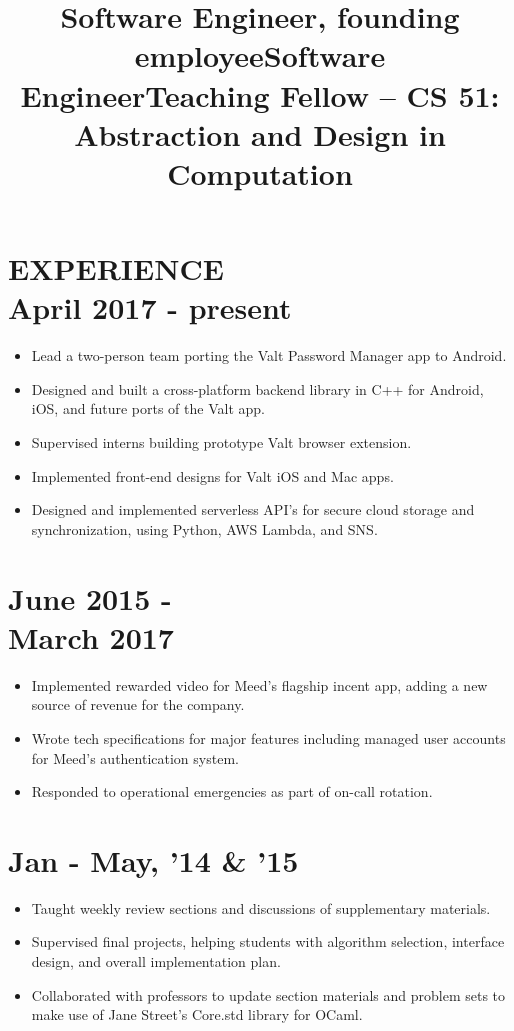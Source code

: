 \documentclass[centered, margin, 10pt]{res} %
\newcommand\mainsectionfont{\normalsize\bf\textup}
\newcommand\subsectionfont{\small\textmd\textup}
\renewcommand\sectionfont{\mainsectionfont} %
\renewcommand\dates{\section} %
\newenvironment{rlist}
    {\begin{minipage}[t]{\linewidth}\begin{itemize}\raggedright}
    {\end{itemize}\end{minipage}}
\newenvironment{positionlist}
    {\begin{position}\begin{rlist}}
    {\end{rlist}\end{position}}
\begin{document}
\begin{resume}

\renewcommand\sectionfont{\subsectionfont} %


\section{{\mainsectionfont EXPERIENCE} \\ April 2017 - present }
\title{Software Engineer, founding employee}
\begin{positionlist}
  \item Lead a two-person team porting the Valt Password Manager app
    to Android.
  \item Designed and built a cross-platform backend library in C++ for Android, iOS,
    and future ports of the Valt app.
  \item Supervised interns building prototype Valt browser extension.
  \item Implemented front-end designs for Valt iOS and Mac apps.
  \item Designed and implemented serverless API's for secure cloud storage
    and synchronization, using Python, AWS Lambda, and SNS.
\end{positionlist}

\title{Software Engineer}
\dates{June 2015 - \\ March 2017}
\begin{positionlist}
  \item Implemented rewarded video for Meed's flagship incent app, adding a new
    source of revenue for the company.
  \item Wrote tech specifications for major features including managed user
    accounts for Meed's authentication system.
  \item Responded to operational emergencies as part of on-call rotation.
\end{positionlist}

\title{Teaching Fellow -- CS 51: Abstraction and Design in Computation}
\dates{Jan - May, '14 \& '15}
\begin{positionlist}
  \item Taught weekly review sections and discussions of supplementary
    materials.
  \item Supervised final projects, helping students with algorithm selection,
    interface design, and overall implementation plan.
  \item Collaborated with professors to update section materials and problem
    sets to make use of Jane Street's Core.std library for OCaml.
\end{positionlist}


\end{resume}
\end{document}
